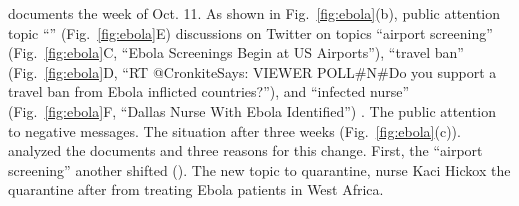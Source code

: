  documents  the week of Oct. 11.
As shown in Fig.~\ref{fig:ebola}(b), public attention   topic ``''  (Fig.~\ref{fig:ebola}E)
discussions on Twitter on topics ``airport screening'' (Fig.~\ref{fig:ebola}C, ``Ebola Screenings Begin at US Airports''), ``travel ban'' (Fig.~\ref{fig:ebola}D, ``RT @CronkiteSays: VIEWER POLL\#N\#Do you support a travel ban from Ebola inflicted countries?''), and ``infected nurse'' (Fig.~\ref{fig:ebola}F, ``Dallas Nurse With Ebola Identified'') .
The public   attention to negative messages.
The situation  after three weeks (Fig.~\ref{fig:ebola}(c)).
 analyzed the documents and  three reasons for this change.
First, the   ``airport screening''  another  shifted  ().
The new topic   to quarantine,  nurse Kaci Hickox  the quarantine  after  from treating Ebola patients in West Africa.
